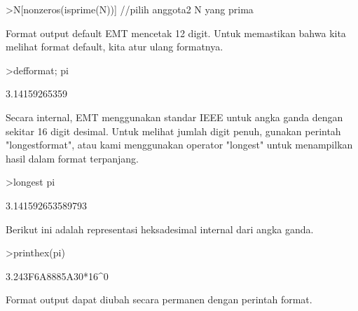 \documentclass[a4paper,10pt]{article}
\begin{document}
\begin{eulernotebook}
\begin{euleroutput}
  [2,  3,  5,  7,  9,  11,  13,  15,  17,  19,  21,  23,  25,  27,  29,
  31,  33,  35,  37,  39,  41,  43,  45,  47,  49,  51,  53,  55,  57,
  59,  61,  63,  65,  67,  69,  71,  73,  75,  77,  79,  81,  83,  85,
  87,  89,  91,  93,  95,  97,  99]
\end{euleroutput}
\begin{eulerprompt}
>N[nonzeros(isprime(N))] //pilih anggota2 N yang prima
\end{eulerprompt}
\begin{euleroutput}
  [2,  3,  5,  7,  11,  13,  17,  19,  23,  29,  31,  37,  41,  43,  47,
  53,  59,  61,  67,  71,  73,  79,  83,  89,  97]
\end{euleroutput}
\begin{eulercomment}
Format output default EMT mencetak 12 digit. Untuk memastikan bahwa
kita melihat format default, kita atur ulang formatnya.
\end{eulercomment}
\begin{eulerprompt}
>defformat; pi
\end{eulerprompt}
\begin{euleroutput}
  3.14159265359
\end{euleroutput}
\begin{eulercomment}
Secara internal, EMT menggunakan standar IEEE untuk angka ganda dengan
sekitar 16 digit desimal. Untuk melihat jumlah digit penuh, gunakan
perintah "longestformat", atau kami menggunakan operator "longest"
untuk menampilkan hasil dalam format terpanjang.
\end{eulercomment}
\begin{eulerprompt}
>longest pi
\end{eulerprompt}
\begin{euleroutput}
        3.141592653589793 
\end{euleroutput}
\begin{eulercomment}
Berikut ini adalah representasi heksadesimal internal dari angka
ganda.
\end{eulercomment}
\begin{eulerprompt}
>printhex(pi)
\end{eulerprompt}
\begin{euleroutput}
  3.243F6A8885A30*16^0
\end{euleroutput}
\begin{eulercomment}
Format output dapat diubah secara permanen dengan perintah format.
\end{eulercomment}

\end{eulernotebook}
\end{document}
